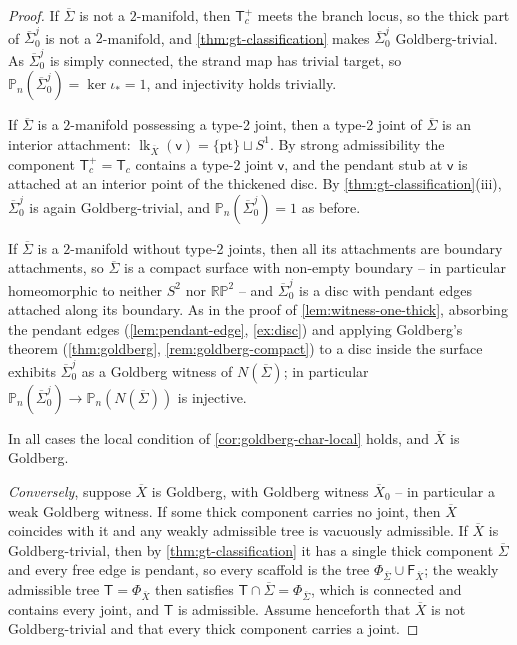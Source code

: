 \documentclass[reqno]{amsart}
\theoremstyle{definition}
\newcommand\sfT{\mathsf{T}}
\newcommand\sfv{\mathsf{v}}
\newcommand{\PB}{\mathbb{P}}
\newcommand{\RP}{\mathbb{RP}}
\renewcommand{\bar}{\overline}
\DeclareMathOperator{\lk}{lk}
\numberwithin{equation}{section}
\begin{document}
\begin{proof}
If \(\bar\Sigma\) is not a \(2\)-manifold, then \(\sfT^+_c\) meets
the branch locus, so the thick part of \(\bar\Sigma_0^j\) is
not a \(2\)-manifold, and \cref{thm:gt-classification} makes
\(\bar\Sigma_0^j\) Goldberg-trivial. As \(\bar\Sigma_0^j\) is
simply connected, the strand map has trivial target, so
\(\PB_n(\bar\Sigma_0^j)=\ker\iota_\ast=1\), and injectivity
holds trivially.

If \(\bar\Sigma\) is a \(2\)-manifold possessing a type-2
joint, then a type-2 joint of \(\bar\Sigma\) is an interior
attachment: \(\lk_{\bar X}(\sfv)=\{\mathrm{pt}\}\sqcup S^1\). By
strong admissibility the component \(\sfT^+_c=\sfT_c\) contains a
type-2 joint \(\sfv\), and the pendant stub at \(\sfv\) is attached
at an interior point of the thickened disc. By
\cref{thm:gt-classification}(iii), \(\bar\Sigma_0^j\) is again
Goldberg-trivial, and \(\PB_n(\bar\Sigma_0^j)=1\) as before.

If \(\bar\Sigma\) is a \(2\)-manifold without type-2 joints,
then all its attachments are boundary attachments, so
\(\bar\Sigma\) is a compact surface with non-empty boundary --
in particular homeomorphic to neither \(S^2\) nor \(\RP^2\) --
and \(\bar\Sigma_0^j\) is a disc with pendant edges attached
along its boundary. As in the proof of
\cref{lem:witness-one-thick}, absorbing the pendant edges
(\cref{lem:pendant-edge}, \cref{ex:disc}) and applying
Goldberg's theorem (\cref{thm:goldberg},
\cref{rem:goldberg-compact}) to a disc inside the surface
exhibits \(\bar\Sigma_0^j\) as a Goldberg witness of
\(N(\bar\Sigma)\); in particular
\(\PB_n(\bar\Sigma_0^j)\to\PB_n(N(\bar\Sigma))\) is injective.

In all cases the local condition of
\cref{cor:goldberg-char-local} holds, and \(\bar X\) is
Goldberg.

\emph{Conversely}, suppose \(\bar X\) is Goldberg, with Goldberg
witness \(\bar X_0\) -- in particular a weak Goldberg witness.
If some thick component carries no joint, then \(\bar X\)
coincides with it and any weakly admissible tree is vacuously admissible. If \(\bar X\) is Goldberg-trivial, then by
\cref{thm:gt-classification} it has a single thick component
\(\bar\Sigma\) and every free edge is pendant, so every scaffold is the tree \(\Phi_{\bar\Sigma}\cup\mathsf F_{\bar X}\);
the weakly admissible tree \(\sfT=\Phi_{\bar X}\) then satisfies
\(\sfT\cap\bar\Sigma=\Phi_{\bar\Sigma}\), which is connected and
contains every joint, and \(\sfT\) is admissible. Assume
henceforth that \(\bar X\) is not Goldberg-trivial and that
every thick component carries a joint.


\end{proof}
\end{document}
